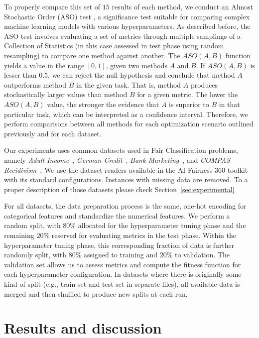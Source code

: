 To properly compare this set of $15$ results of each method, we conduct an Almost Stochastic Order (ASO) test \citep{dror2019deep}, a significance test suitable for comparing complex machine learning models with various hyperparameters. As described before, the ASO test involves evaluating a set of metrics through multiple samplings of a Collection of Statistics (in this case assessed in test phase using random resampling) to compare one method against another. The $ASO(A, B)$ function yields a value in the range $[0, 1]$, given two methods $A$ and $B$. If $ASO(A, B)$ is lesser than $0.5$, we can reject the null hypothesis and conclude that method $A$ outperforms method $B$ in the given task. That is, method $A$ produces stochastically larger values than method $B$ for a given metric. The lower the $ASO(A, B)$ value, the stronger the evidence that $A$ is superior to $B$ in that particular task, which can be interpreted as a confidence interval. Therefore, we perform comparisons between all methods for each optimization scenario outlined previously and for each dataset.

Our experiments uses common datasets used in Fair Classification problems, namely \textit{Adult Income}~\citep{misc_adult_2}, \textit{German Credit}~\citep{misc_statlog_(german_credit_data)_144}, \textit{Bank Marketing}~\citep{misc_bank_marketing_222}, and \textit{COMPAS Recidivism}~\citep{misc_compas}. We use the dataset readers available in the AI Fairness 360 toolkit~\citep{aif360-oct-2018} with its standard configurations. Instances with missing data are removed. To a proper description of those datasets please check Section~\ref{sec:experimental}

For all datasets, the data preparation process is the same, one-hot encoding for categorical features and standardize the numerical features. We perform a random split, with $80\%$ allocated for the hyperparameter tuning phase and the remaining $20\%$ reserved for evaluating metrics in the test phase. Within the hyperparameter tuning phase, this corresponding fraction of data is further randomly split, with $80\%$ assigned to training and $20\%$ to validation. The validation set allows us to assess metrics and compute the fitness function for each hyperparameter configuration. In datasets where there is originally some kind of split (e.g., train set and test set in separate files), all available data is merged and then shuffled to produce new splits at each run.

\section{Results and discussion}

